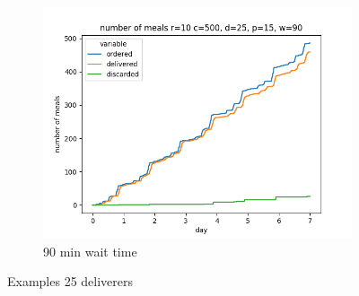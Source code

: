 \begin{center}
\begin{figure}
        \hfill
        \begin{subfigure}[m]{0.30\textwidth}
            \centering
            \includegraphics[width=\textwidth]{sections/run3/week_nd_3_food_ordering_distribution_500_10_25_90}
            \caption{90 min wait time}
        \end{subfigure}
        \caption{Examples 25 deliverers}
        \label{fig:examples 25 deliverers different wait time}
    \end{figure}
\end{center}
